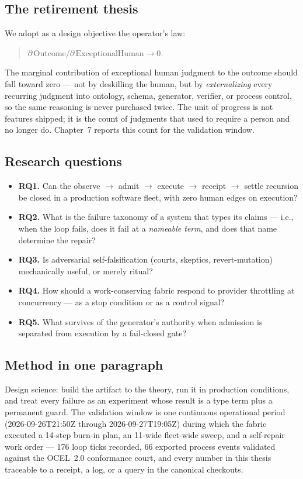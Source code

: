 \documentclass[11pt,a4paper]{article}
\theoremstyle{remark}
\begin{document}
\subsection{The retirement thesis}
We adopt as a design objective the operator's law:
\begin{quote}\itshape
$\partial\,\mathrm{Outcome}/\partial\,\mathrm{ExceptionalHuman} \to 0$.
\end{quote}
The marginal contribution of exceptional human judgment to the outcome should fall toward zero --- not by deskilling the human, but by \emph{externalizing} every recurring judgment into ontology, schema, generator, verifier, or process control, so the same reasoning is never purchased twice. The unit of progress is not features shipped; it is the count of judgments that used to require a person and no longer do. Chapter~7 reports this count for the validation window.

\subsection{Research questions}
\begin{itemize}
\item \textbf{RQ1.} Can the observe $\to$ admit $\to$ execute $\to$ receipt $\to$ settle recursion be closed in a production software fleet, with zero human edges on execution?
\item \textbf{RQ2.} What is the failure taxonomy of a system that types its claims --- i.e., when the loop fails, does it fail at a \emph{nameable term}, and does that name determine the repair?
\item \textbf{RQ3.} Is adversarial self-falsification (courts, skeptics, revert-mutation) mechanically useful, or merely ritual?
\item \textbf{RQ4.} How should a work-conserving fabric respond to provider throttling at concurrency --- as a stop condition or as a control signal?
\item \textbf{RQ5.} What survives of the generator's authority when admission is separated from execution by a fail-closed gate?
\end{itemize}

\subsection{Method in one paragraph}
Design science: build the artifact to the theory, run it in production conditions, and treat every failure as an experiment whose result is a type term plus a permanent guard. The validation window is one continuous operational period (2026-09-26T21:50Z through 2026-09-27T19:05Z) during which the fabric executed a 14-step burn-in plan, an 11-wide fleet-wide sweep, and a self-repair work order --- 176 loop ticks recorded, 66 exported process events validated against the OCEL~2.0 conformance court, and every number in this thesis traceable to a receipt, a log, or a query in the canonical checkouts.
\end{document}
